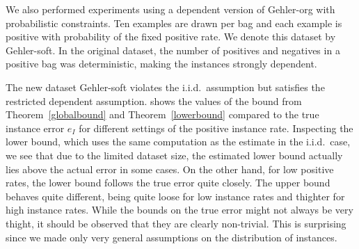 We also performed experiments using a dependent version of Gehler-org
with probabilistic constraints. Ten examples are drawn per bag and each example is positive with probability
of the fixed positive rate. We denote this dataset by Gehler-soft. In the original dataset, the number of positives and negatives in a positive bag
was deterministic, making the instances strongly dependent.

The new dataset Gehler-soft violates the i.i.d.\ assumption but satisfies the
restricted dependent assumption. 
shows the values of the bound from Theorem~\ref{globalbound} and Theorem~\ref{lowerbound} compared to the
true instance error $e_I$ for different settings of the positive instance rate.
Inspecting the lower bound, which uses the same computation as the estimate in the i.i.d.\ case, we see that due to the limited
dataset size, the estimated lower bound actually lies above the actual error in some cases. On the other hand, for low positive
rates, the lower bound follows the true error quite closely.
The upper bound behaves quite different, being quite loose for low instance rates and thighter for high instance rates.
While the bounds on the true error might not always be very thight, it should be observed that they are clearly
non-trivial. This is surprising since we made only very general assumptions on the distribution of instances.

